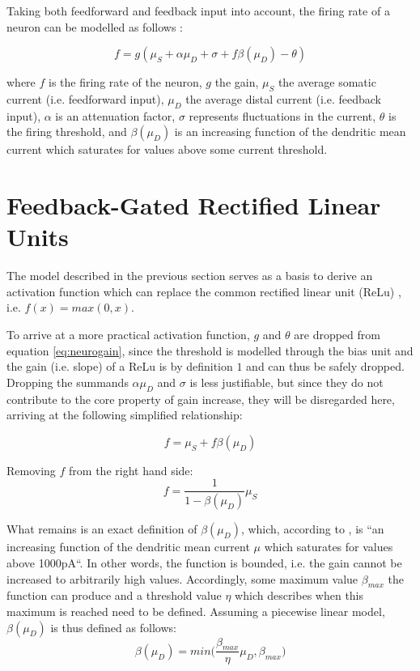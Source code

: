\documentclass{article}
\begin{document}
Taking both feedforward and feedback input into account, the firing rate of a neuron can be modelled as follows \cite{larkum2004}:

\begin{equation} 
	\label{eq:neurogain}
	f = g(\mu_S + \alpha \mu_D + \sigma + f\beta(\mu_D)-\theta)
\end{equation}

where $f$ is the firing rate of the neuron, $g$ the gain, $\mu_S$ the average somatic current (i.e. feedforward input), $\mu_D$ the average distal current (i.e. feedback input), $\alpha$ is an attenuation factor, $\sigma$ represents fluctuations in the current, $\theta$ is the firing threshold, and $\beta(\mu_D)$ is an increasing function of the dendritic mean current which saturates for values above some current threshold.  

\section{Feedback-Gated Rectified Linear Units} 
The model described in the previous section serves as a basis to derive an activation function which can replace the common rectified linear unit (ReLu) \cite{nair2010rectified}, i.e. $f(x) = max(0, x)$.  

To arrive at a more practical activation function, $g$ and $\theta$ are dropped from equation \ref{eq:neurogain}, since the threshold is modelled through the bias unit and the gain (i.e. slope) of a ReLu is by definition $1$ and can thus be safely dropped. Dropping the summands $\alpha \mu_D$ and $\sigma$ is less justifiable, but since they do not contribute to the core property of gain increase, they will be disregarded here, arriving at the following simplified relationship: 

\begin{equation}
	f = \mu_S + f\beta(\mu_D)
\end{equation}

Removing $f$ from the right hand side: 
\begin{equation} 
\label{eq:rate1}
	f = \frac{1}{1 - \beta(\mu_D)} \mu_S
\end{equation}

What remains is an exact definition of $\beta(\mu_D)$, which, according to \cite{larkum2004}, is ``an increasing function of the dendritic mean current $\mu$ which saturates for values above 1000pA``. In other words, the function is bounded, i.e. the gain cannot be increased to arbitrarily high values. Accordingly, some maximum value $\beta_{max}$ the function can produce and a threshold value $\eta$ which describes when this maximum is reached need to be defined. 
Assuming a piecewise linear model, $\beta(\mu_D)$ is thus defined as follows: 
\begin{equation}
\label{eq:betafunc}
	\beta(\mu_D) = min \bigg(\frac{\beta_{max}}{\eta} \mu_D, \beta_{max}\bigg)
\end{equation} 
\end{document}
